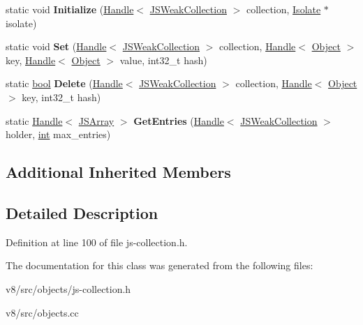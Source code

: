 \begin{DoxyCompactItemize}
\item 
\mbox{\label{classv8_1_1internal_1_1JSWeakCollection_a553122e983caa4cc1b6de16d4d455693}} 
static void {\bfseries Initialize} (\mbox{\hyperlink{classv8_1_1internal_1_1Handle}{Handle}}$<$ \mbox{\hyperlink{classv8_1_1internal_1_1JSWeakCollection}{J\+S\+Weak\+Collection}} $>$ collection, \mbox{\hyperlink{classv8_1_1internal_1_1Isolate}{Isolate}} $\ast$isolate)
\item 
\mbox{\label{classv8_1_1internal_1_1JSWeakCollection_a2286836f893092b790d809b462f50ef8}} 
static void {\bfseries Set} (\mbox{\hyperlink{classv8_1_1internal_1_1Handle}{Handle}}$<$ \mbox{\hyperlink{classv8_1_1internal_1_1JSWeakCollection}{J\+S\+Weak\+Collection}} $>$ collection, \mbox{\hyperlink{classv8_1_1internal_1_1Handle}{Handle}}$<$ \mbox{\hyperlink{classv8_1_1internal_1_1Object}{Object}} $>$ key, \mbox{\hyperlink{classv8_1_1internal_1_1Handle}{Handle}}$<$ \mbox{\hyperlink{classv8_1_1internal_1_1Object}{Object}} $>$ value, int32\+\_\+t hash)
\item 
\mbox{\label{classv8_1_1internal_1_1JSWeakCollection_aa429c39e297d4809322baf09d890098f}} 
static \mbox{\hyperlink{classbool}{bool}} {\bfseries Delete} (\mbox{\hyperlink{classv8_1_1internal_1_1Handle}{Handle}}$<$ \mbox{\hyperlink{classv8_1_1internal_1_1JSWeakCollection}{J\+S\+Weak\+Collection}} $>$ collection, \mbox{\hyperlink{classv8_1_1internal_1_1Handle}{Handle}}$<$ \mbox{\hyperlink{classv8_1_1internal_1_1Object}{Object}} $>$ key, int32\+\_\+t hash)
\item 
\mbox{\label{classv8_1_1internal_1_1JSWeakCollection_a0674a47a2a31a59c54f30764e5093727}} 
static \mbox{\hyperlink{classv8_1_1internal_1_1Handle}{Handle}}$<$ \mbox{\hyperlink{classv8_1_1internal_1_1JSArray}{J\+S\+Array}} $>$ {\bfseries Get\+Entries} (\mbox{\hyperlink{classv8_1_1internal_1_1Handle}{Handle}}$<$ \mbox{\hyperlink{classv8_1_1internal_1_1JSWeakCollection}{J\+S\+Weak\+Collection}} $>$ holder, \mbox{\hyperlink{classint}{int}} max\+\_\+entries)
\end{DoxyCompactItemize}
\subsection*{Additional Inherited Members}


\subsection{Detailed Description}


Definition at line 100 of file js-\/collection.\+h.



The documentation for this class was generated from the following files\+:\begin{DoxyCompactItemize}
\item 
v8/src/objects/js-\/collection.\+h\item 
v8/src/objects.\+cc\end{DoxyCompactItemize}
